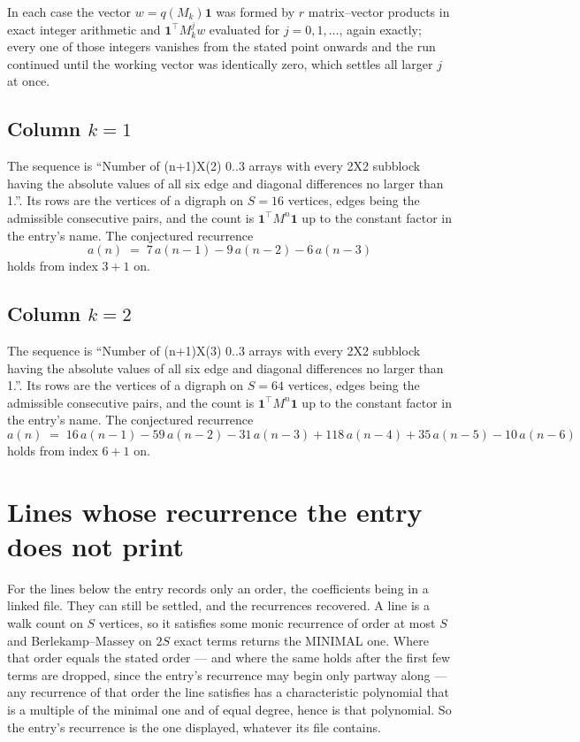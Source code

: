 \documentclass[11pt,a4paper]{article}
\theoremstyle{plain}
\theoremstyle{definition}
\begin{document}
In each case the vector $w=q(M_k)\mathbf{1}$ was formed by $r$ matrix--vector products in
exact integer arithmetic and $\mathbf{1}^{\!\top}M_k^{j}w$ evaluated for $j=0,1,\dots$,
again exactly; every one of those integers vanishes from the stated point onwards and the run
continued until the working vector was identically zero, which settles all larger $j$ at once.

\subsection*{Column $k$$=1$}
The sequence is ``Number of (n+1)X(2) 0..3 arrays with every 2X2 subblock having the absolute values of all six edge and diagonal differences no larger than 1.''. Its rows are the vertices of a digraph on
$S=16$ vertices, edges being the admissible consecutive pairs, and the count is
$\mathbf{1}^{\!\top}M^{n}\mathbf{1}$ up to the constant factor in the entry's name.
The conjectured recurrence
\[
a(n)\;=\;7\,a(n-1) - 9\,a(n-2) - 6\,a(n-3)
\]
holds from index $3+1$ on.

\subsection*{Column $k$$=2$}
The sequence is ``Number of (n+1)X(3) 0..3 arrays with every 2X2 subblock having the absolute values of all six edge and diagonal differences no larger than 1.''. Its rows are the vertices of a digraph on
$S=64$ vertices, edges being the admissible consecutive pairs, and the count is
$\mathbf{1}^{\!\top}M^{n}\mathbf{1}$ up to the constant factor in the entry's name.
The conjectured recurrence
\[
a(n)\;=\;16\,a(n-1) - 59\,a(n-2) - 31\,a(n-3) + 118\,a(n-4) + 35\,a(n-5) - 10\,a(n-6)
\]
holds from index $6+1$ on.


\section{Lines whose recurrence the entry does not print}

For the lines below the entry records only an order, the coefficients being in a linked file.
They can still be settled, and the recurrences recovered. A line is a walk count on $S$
vertices, so it satisfies some monic recurrence of order at most $S$ and Berlekamp--Massey on
$2S$ exact terms returns the MINIMAL one. Where that order equals the stated order --- and
where the same holds after the first few terms are dropped, since the entry's recurrence may
begin only partway along --- any recurrence of that order the line satisfies has a
characteristic polynomial that is a multiple of the minimal one and of equal degree, hence is
that polynomial. So the entry's recurrence is the one displayed, whatever its file contains.
\end{document}
